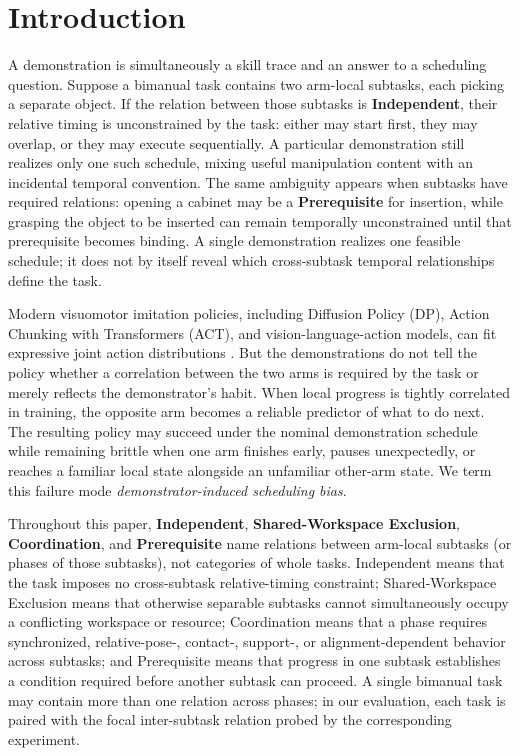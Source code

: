 \documentclass{article}
\begin{document}
\section{Introduction}
A demonstration is simultaneously a skill trace and an answer to a scheduling question. Suppose a bimanual task contains two arm-local subtasks, each picking a separate object. If the relation between those subtasks is \textbf{Independent}, their relative timing is unconstrained by the task: either may start first, they may overlap, or they may execute sequentially. A particular demonstration still realizes only one such schedule, mixing useful manipulation content with an incidental temporal convention. The same ambiguity appears when subtasks have required relations: opening a cabinet may be a \textbf{Prerequisite} for insertion, while grasping the object to be inserted can remain temporally unconstrained until that prerequisite becomes binding. A single demonstration realizes one feasible schedule; it does not by itself reveal which cross-subtask temporal relationships define the task.

Modern visuomotor imitation policies, including Diffusion Policy (DP), Action Chunking with Transformers (ACT), and vision-language-action models, can fit expressive joint action distributions \citep{chi2023diffusion,zhao2023act,pi2025pi05}. But the demonstrations do not tell the policy whether a correlation between the two arms is required by the task or merely reflects the demonstrator's habit. When local progress is tightly correlated in training, the opposite arm becomes a reliable predictor of what to do next. The resulting policy may succeed under the nominal demonstration schedule while remaining brittle when one arm finishes early, pauses unexpectedly, or reaches a familiar local state alongside an unfamiliar other-arm state. We term this failure mode \emph{demonstrator-induced scheduling bias}.

Throughout this paper, \textbf{Independent}, \textbf{Shared-Workspace Exclusion}, \textbf{Coordination}, and \textbf{Prerequisite} name relations between arm-local subtasks (or phases of those subtasks), not categories of whole tasks. Independent means that the task imposes no cross-subtask relative-timing constraint; Shared-Workspace Exclusion means that otherwise separable subtasks cannot simultaneously occupy a conflicting workspace or resource; Coordination means that a phase requires synchronized, relative-pose-, contact-, support-, or alignment-dependent behavior across subtasks; and Prerequisite means that progress in one subtask establishes a condition required before another subtask can proceed. A single bimanual task may contain more than one relation across phases; in our evaluation, each task is paired with the focal inter-subtask relation probed by the corresponding experiment.
\end{document}
